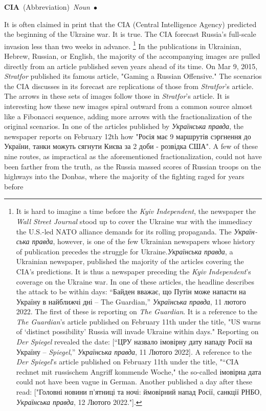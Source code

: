 \documentclass[10pt,a4paper,twoside]{article} %
\newcommand{\entry}[4]{\markboth{#1}{#1}\textbf{#1}\ {(#2)}\ \textit{#3}\ $\bullet$\ {#4}}  %
\begin{document}
\begin{multicols}{2}

\entry{CIA} {Abbreviation} {Noun} {

It is often claimed in print that the CIA (Central Intelligence Agency) predicted the beginning of the Ukraine war. It is true. The CIA forecast Russia's full-scale invasion less than two weeks in advance. \footnote{ It is hard to imagine a time before the \emph{Kyiv Independent}, the newspaper the \emph{Wall Street Journal} stood up to cover the Ukraine war with the immediacy the U.S.-led NATO alliance demands for its rolling propaganda. The \textukrainian{\emph{Українська правда}}, however, is one of the few Ukrainian newspapers whose history of publication precedes the struggle for Ukraine.\textukrainian{\emph{Українська правда}}, a Ukrainian newspaper, published the majority of the articles covering the CIA's predictions. It is thus a newspaper preceding the \emph{Kyiv Independent}'s coverage on the Ukraine war. In one of these articles, the headline describes the attack to be within days: \textukrainian{“Байден вважає, що Путін може напасти на Україну в найближчі дні} – The Guardian,” \textukrainian{\emph{Українська правда}}, 11 \textukrainian{лютого} 2022. The first of these is reporting on \emph{The Guardian}. It is a reference to the \emph{The Guardian}'s article published on February 11th under the title, "US warns of ‘distinct possibility’ Russia will invade Ukraine within days." Reporting on \emph{Der Spiegel} revealed the date: [“\textukrainian{ЦРУ назвало імовірну дату нападу Росії на Україну} – \emph{Spiegel},” \textukrainian{\emph{Українська правда}}, 11 \textukrainian{Лютого} 2022]. A reference to the \emph{Der Spiegel}'s article published on February 11th under the title, "“CIA rechnet mit russischem Angriff kommende Woche," the so-called \textukrainian{імовірна дата} could not have been vague in German. Another published a day after these read: ["\textukrainian{Головні новини п’ятниці та ночі: ймовірний напад Росії, санкції РНБО}, \textukrainian{\emph{Українська правда}}, 12 \textukrainian{Лютого} 2022."].} In the publications in Ukrainian, Hebrew, Russian, or English, the majority of the accompanying images are pulled directly from an article published seven years ahead of its time. On Mar 9, 2015, \emph{Stratfor} published its famous article, "Gaming a Russian Offensive." The scenarios the CIA discusses in its forecast are replications of those from \emph{Stratfor}'s article. The arrows in these sets of images follow those in \emph{Stratfor}'s article.  \newline \indent It is interesting how these new images spiral outward from a common source almost like a Fibonacci sequence, adding more arrows with the fractionalization of the original scenarios.  In one of the articles published by \textukrainian{\emph{Українська правда}}, the newspaper reports on February 12th how \textukrainian{"Росія має 9 маршрутів сэргнення до України, танки можуть сягнути Києва за 2 доби - розвідка США"}. A few of these nine routes, as impractical as the aforementioned fractionalization, could not have been farther from the truth, as the Russia massed scores of Russian troops on the highways into the Donbas, where the majority of the fighting raged for years before }
\end{multicols}
\end{document}
